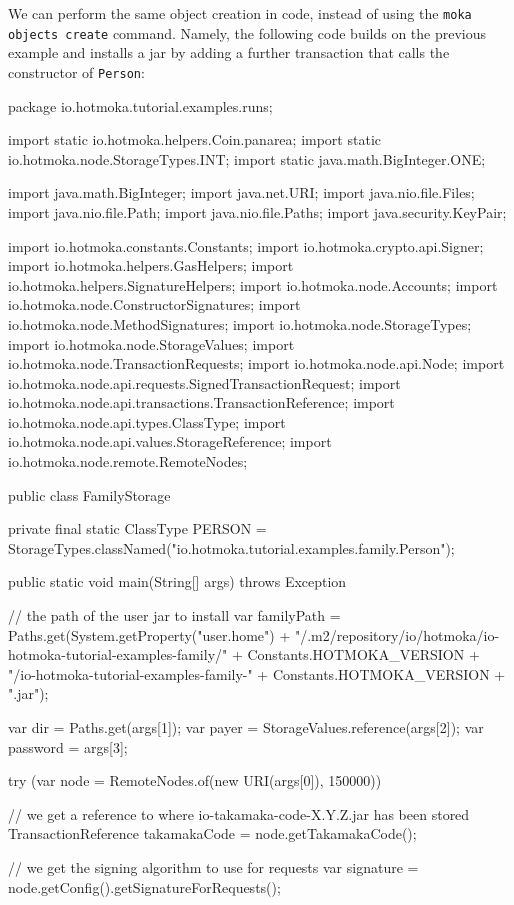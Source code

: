 We can perform the same object creation in code, instead of using the
\texttt{moka objects create} command.
Namely, the following code builds on the previous example and installs a jar by adding
a further transaction that calls the constructor of \texttt{Person}:
%
\begin{codebox}\begin{javalst}
package io.hotmoka.tutorial.examples.runs;

import static io.hotmoka.helpers.Coin.panarea;
import static io.hotmoka.node.StorageTypes.INT;
import static java.math.BigInteger.ONE;

import java.math.BigInteger;
import java.net.URI;
import java.nio.file.Files;
import java.nio.file.Path;
import java.nio.file.Paths;
import java.security.KeyPair;

import io.hotmoka.constants.Constants;
import io.hotmoka.crypto.api.Signer;
import io.hotmoka.helpers.GasHelpers;
import io.hotmoka.helpers.SignatureHelpers;
import io.hotmoka.node.Accounts;
import io.hotmoka.node.ConstructorSignatures;
import io.hotmoka.node.MethodSignatures;
import io.hotmoka.node.StorageTypes;
import io.hotmoka.node.StorageValues;
import io.hotmoka.node.TransactionRequests;
import io.hotmoka.node.api.Node;
import io.hotmoka.node.api.requests.SignedTransactionRequest;
import io.hotmoka.node.api.transactions.TransactionReference;
import io.hotmoka.node.api.types.ClassType;
import io.hotmoka.node.api.values.StorageReference;
import io.hotmoka.node.remote.RemoteNodes;

public class FamilyStorage {

  private final static ClassType PERSON = StorageTypes.classNamed("io.hotmoka.tutorial.examples.family.Person");

  public static void main(String[] args) throws Exception {
    // the path of the user jar to install
    var familyPath = Paths.get(System.getProperty("user.home")
    + "/.m2/repository/io/hotmoka/io-hotmoka-tutorial-examples-family/"
    + Constants.HOTMOKA_VERSION
    + "/io-hotmoka-tutorial-examples-family-" + Constants.HOTMOKA_VERSION + ".jar");

    var dir = Paths.get(args[1]);
    var payer = StorageValues.reference(args[2]);
    var password = args[3];

    try (var node = RemoteNodes.of(new URI(args[0]), 150000)) {
      // we get a reference to where io-takamaka-code-X.Y.Z.jar has been stored
      TransactionReference takamakaCode = node.getTakamakaCode();

      // we get the signing algorithm to use for requests
      var signature = node.getConfig().getSignatureForRequests();

}}}
\end{javalst}
\end{codebox}
